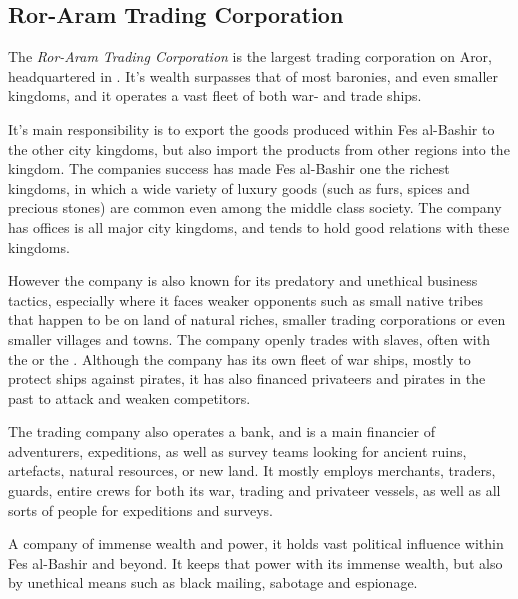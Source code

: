 \subsection{Ror-Aram Trading Corporation}
\label{sec:Ror-Aram Trading Corporation}

The \emph{Ror-Aram Trading Corporation} is the largest trading corporation on
Aror, headquartered in . It's wealth surpasses
that of most baronies, and even smaller kingdoms, and it operates a vast fleet
of both war- and trade ships.

It's main responsibility is to export the goods produced within Fes al-Bashir
to the other city kingdoms, but also import the products from other regions
into the kingdom. The companies success has made Fes al-Bashir one the richest
kingdoms, in which a wide variety of luxury goods (such as furs, spices and
precious stones) are common even among the middle class society. The company
has offices is all major city kingdoms, and tends to hold good relations with
these kingdoms.

However the company is also known for its predatory and unethical business
tactics, especially where it faces weaker opponents such as small native
tribes that happen to be on land of natural riches, smaller trading
corporations or even smaller villages and towns. The company openly trades
with slaves, often with the  or the
. Although the company has its own fleet of war
ships, mostly to protect ships against pirates, it has also financed
privateers and pirates in the past to attack and weaken competitors.

The trading company also operates a bank, and is a main financier of
adventurers, expeditions, as well as survey teams looking for ancient ruins,
artefacts, natural resources, or new land. It mostly employs merchants,
traders, guards, entire crews for both its war, trading and privateer vessels,
as well as all sorts of people for expeditions and surveys.

A company of immense wealth and power, it holds vast political influence
within Fes al-Bashir and beyond. It keeps that power with its immense
wealth, but also by unethical means such as black mailing, sabotage and
espionage.
